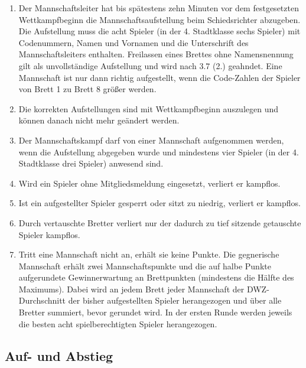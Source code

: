\documentclass[fontsize=12pt, paper=a4, ngerman]{article}
\begin{document}
\begin{enumerate}
\item Der Mannschaftsleiter hat bis spätestens zehn Minuten vor dem festgesetzten Wettkampfbeginn die Mannschaftsaufstellung beim Schiedsrichter abzugeben.
Die Aufstellung muss die acht Spieler (in der 4. Stadtklasse sechs Spieler) mit Codenummern, Namen und Vornamen und die Unterschrift des Mannschaftsleiters
enthalten. Freilassen eines Brettes ohne Namensnennung gilt als unvollständige Aufstellung und wird nach 3.7 (2.) geahndet. %
Eine Mannschaft ist nur dann richtig aufgestellt, wenn die Code-Zahlen der Spieler von Brett 1 zu Brett 8 größer werden.
\item Die korrekten Aufstellungen sind mit Wettkampfbeginn auszulegen und können danach nicht
mehr geändert werden.
\item Der Mannschaftskampf darf von einer Mannschaft aufgenommen werden, wenn die Aufstellung
abgegeben wurde und mindestens vier Spieler (in der 4. Stadtklasse drei Spieler) anwesend sind.
\item Wird ein Spieler ohne Mitgliedsmeldung eingesetzt, verliert er kampflos.
\item Ist ein aufgestellter Spieler gesperrt oder sitzt zu niedrig, verliert er kampflos.
\item Durch vertauschte Bretter verliert nur der dadurch zu tief sitzende getauschte Spieler kampflos.
\item Tritt eine Mannschaft nicht an, erhält sie keine Punkte. Die gegnerische Mannschaft erhält zwei Mannschaftspunkte und die auf halbe Punkte aufgerundete
Gewinnerwartung an Brettpunkten (mindestens die Hälfte des Maximums). Dabei wird an jedem Brett jeder Mannschaft der DWZ-Durchschnitt der bisher aufgestellten
Spieler herangezogen und über alle Bretter summiert, bevor gerundet wird. In der ersten Runde werden jeweils die besten acht spielberechtigten Spieler herangezogen.
\end{enumerate}

\subsection{Auf- und Abstieg}
\end{document}
